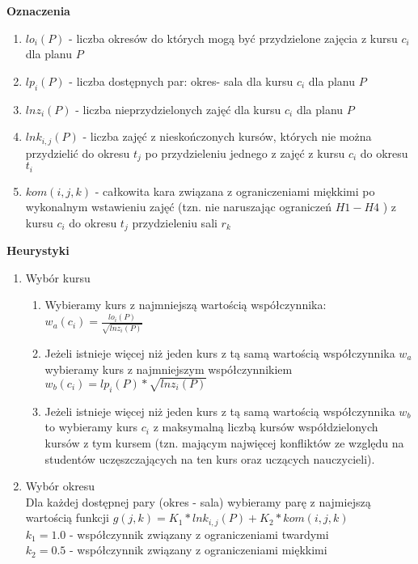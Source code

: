 \par \textbf{Oznaczenia}
\begin{enumerate}
\item $ lo_{i}(P)$ - liczba okresów do których mogą być przydzielone zajęcia z kursu $c_{i}$ dla planu ${P}$
\item $ lp_{i}(P)$ - liczba dostępnych par: okres- sala dla kursu ${c_{i}}$ dla planu ${P}$
\item $ lnz_{i}(P)$ - liczba nieprzydzielonych zajęć dla kursu ${c_{i}}$ dla planu ${P}$
\item $ lnk_{i, j}(P)$ - liczba zajęć z nieskończonych kursów, których nie można przydzielić do okresu ${t_{j}}$ po przydzieleniu jednego z zajęć z kursu ${c_{i}}$ do okresu ${t_{i}}$
\item $kom(i, j, k)$ - całkowita kara związana z ograniczeniami miękkimi po wykonalnym wstawieniu zajęć (tzn. nie naruszając ograniczeń $H1 - H4$ ) z kursu $c_{i}$ do okresu ${t_{j}}$ przydzieleniu sali ${r_{k}}$
\end{enumerate}
\par \textbf{Heurystyki}

\begin{enumerate}
  \item Wybór kursu 
  \begin{enumerate}
    \item Wybieramy kurs z najmniejszą wartością współczynnika:\\
     $ w_a(c_{i}) = \frac{lo_{i}(P)}{\sqrt{lnz_{i}(P)}}$
    \item Jeżeli istnieje więcej niż jeden kurs z tą samą wartością współczynnika ${w_a}$ wybieramy kurs z najmniejszym współczynnikiem \\ $ w_b(c_{i}) = lp_{i}(P) * \sqrt{lnz_{i}(P)} $
    \item Jeżeli istnieje więcej niż jeden kurs z tą samą wartością współczynnika $w_b$ to wybieramy kurs ${c_{i}}$ z maksymalną liczbą kursów współdzielonych kursów z tym kursem (tzn. mającym najwięcej konfliktów ze względu na studentów uczęszczających na ten kurs oraz uczących nauczycieli).
  \end{enumerate}
  \item Wybór okresu \\
  Dla każdej dostępnej pary (okres - sala) wybieramy parę z najmiejszą wartością funkcji $g(j, k) = K_{1} * lnk_{i,j}(P) + K_{2} * kom(i, j, k)$ \\
  $k_{1} = 1.0 $ - współczynnik związany z ograniczeniami twardymi \\
  $k_{2} = 0.5 $ - współczynnik związany z ograniczeniami miękkimi
\end{enumerate}




